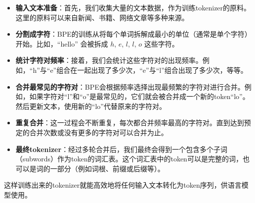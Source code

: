 \documentclass{article}
\begin{document}
\begin{itemize}
    \item \textbf{输入文本准备}：首先，我们收集大量的文本数据，作为训练tokenizer的原料。这里的原料可以来自新闻、书籍、网络文章等多种来源。
    \item \textbf{分割成字符}：BPE的训练从将每个单词拆解成最小的单位（通常是单个字符）开始。比如，“hello” 会被拆成 $h$, $e$, $l$, $l$, $o$ 这些字符。
    \item \textbf{统计字符对频率}：接着，我们会统计这些字符对的出现频率。例如，“h”与“e”组合在一起出现了多少次，“e”与“l”组合出现了多少次，等等。
    \item \textbf{合并最常见的字符对}：BPE会根据频率选择出现最频繁的字符对进行合并。例如，如果字符对“l”和“o”是最常见的，它们就会被合并成一个新的token“lo”。然后更新文本，使用新的“lo”代替原来的字符对。
    \item \textbf{重复合并}：这一过程会不断重复，每次都合并频率最高的字符对。直到达到预定的合并次数或没有更多的字符对可以合并为止。
    \item \textbf{最终tokenizer}：经过多轮合并后，我们最终会得到一个包含多个子词（subwords）作为token的词汇表。这个词汇表中的token可以是完整的词，也可以是词的一部分（例如词根、前缀或后缀等）。
\end{itemize}

这样训练出来的tokenizer就能高效地将任何输入文本转化为token序列，供语言模型使用。
\end{document}
